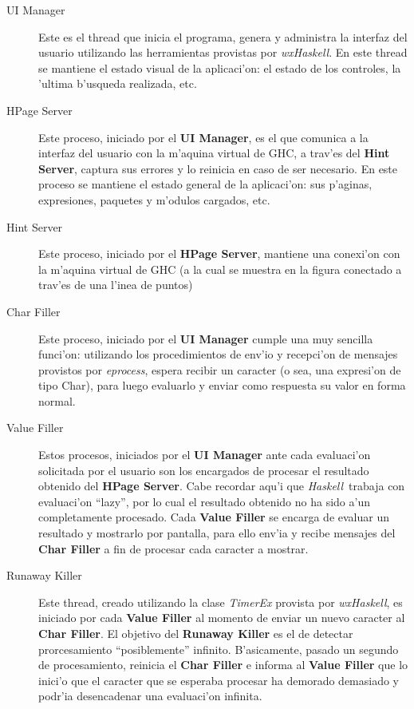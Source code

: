 \documentclass[a4paper]{article}
\newcommand{\haskell}{\textsl{Haskell}}
\begin{document}
\begin{description}
	\item[UI Manager] Este es el thread que inicia el programa, genera y administra la interfaz del usuario utilizando las herramientas provistas por \textsl{wxHaskell}.  En este thread se mantiene el estado visual de la aplicaci'on: el estado de los controles, la 'ultima b'usqueda realizada, etc.
	\item[HPage Server] Este proceso, iniciado por el \textbf{UI Manager}, es el que comunica a la interfaz del usuario con la m'aquina virtual de GHC, a trav'es del \textbf{Hint Server}, captura sus errores y lo reinicia en caso de ser necesario.  En este proceso se mantiene el estado general de la aplicaci'on: sus p'aginas, expresiones, paquetes y m'odulos cargados, etc.
	\item[Hint Server] Este proceso, iniciado por el \textbf{HPage Server}, mantiene una conexi'on con la m'aquina virtual de GHC (a la cual se muestra en la figura conectado a trav'es de una l'inea de puntos)
	\item[Char Filler] Este proceso, iniciado por el \textbf{UI Manager} cumple una muy sencilla funci'on: utilizando los procedimientos de env'io y recepci'on de mensajes provistos por \textsl{eprocess}, espera recibir un caracter (o sea, una expresi'on de tipo Char), para luego evaluarlo y enviar como respuesta su valor en forma normal.
	\item[Value Filler] Estos procesos, iniciados por el \textbf{UI Manager} ante cada evaluaci'on solicitada por el usuario son los encargados de procesar el resultado obtenido del \textbf{HPage Server}. Cabe recordar aqu'i que \haskell\ trabaja con evaluaci'on ``lazy'', por lo cual el resultado obtenido no ha sido a'un completamente procesado.  Cada \textbf{Value Filler} se encarga de evaluar un resultado y mostrarlo por pantalla, para ello env'ia y recibe mensajes del \textbf{Char Filler} a fin de procesar cada caracter a mostrar.
	\item[Runaway Killer] Este thread, creado utilizando la clase \textsl{TimerEx} provista por \textsl{wxHaskell}, es iniciado por cada \textbf{Value Filler} al momento de enviar un nuevo caracter al \textbf{Char Filler}.  El objetivo del \textbf{Runaway Killer} es el de detectar prorcesamiento ``posiblemente'' infinito.  B'asicamente, pasado un segundo de procesamiento, reinicia el \textbf{Char Filler} e informa al \textbf{Value Filler} que lo inici'o que el caracter que se esperaba procesar ha demorado demasiado y podr'ia desencadenar una evaluaci'on infinita.
\end{description}
\end{document}
